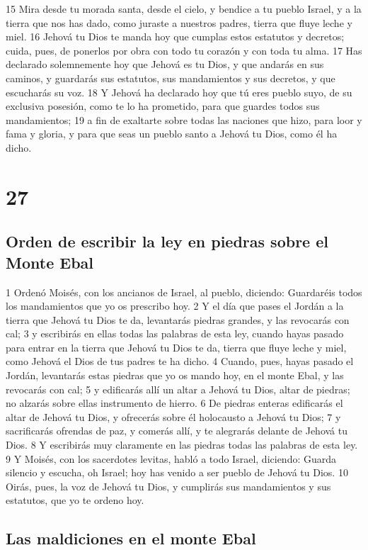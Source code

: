 15 Mira desde tu morada santa, desde el cielo, y bendice a tu pueblo Israel, y a la tierra que nos has dado, como juraste a nuestros padres, tierra que fluye leche y miel.
16 Jehová tu Dios te manda hoy que cumplas estos estatutos y decretos; cuida, pues, de ponerlos por obra con todo tu corazón y con toda tu alma.
17 Has declarado solemnemente hoy que Jehová es tu Dios, y que andarás en sus caminos, y guardarás sus estatutos, sus mandamientos y sus decretos, y que escucharás su voz.
18 Y Jehová ha declarado hoy que tú eres pueblo suyo, de su exclusiva posesión, como te lo ha prometido, para que guardes todos sus mandamientos;
19 a fin de exaltarte sobre todas las naciones que hizo, para loor y fama y gloria, y para que seas un pueblo santo a Jehová tu Dios, como él ha dicho.

\chapter{27}

\section{Orden de escribir la ley en piedras sobre el Monte Ebal}

1 Ordenó Moisés, con los ancianos de Israel, al pueblo, diciendo: Guardaréis todos los mandamientos que yo os prescribo hoy.
2 Y el día que pases el Jordán a la tierra que Jehová tu Dios te da, levantarás piedras grandes, y las revocarás con cal; 
3 y escribirás en ellas todas las palabras de esta ley, cuando hayas pasado para entrar en la tierra que Jehová tu Dios te da, tierra que fluye leche y miel, como Jehová el Dios de tus padres te ha dicho.
4 Cuando, pues, hayas pasado el Jordán, levantarás estas piedras que yo os mando hoy, en el monte Ebal, y las revocarás con cal;
5 y edificarás allí un altar a Jehová tu Dios, altar de piedras; no alzarás sobre ellas instrumento de hierro.
6 De piedras enteras edificarás el altar de Jehová tu Dios, y ofrecerás sobre él holocausto a Jehová tu Dios;
7 y sacrificarás ofrendas de paz, y comerás allí, y te alegrarás delante de Jehová tu Dios.
8 Y escribirás muy claramente en las piedras todas las palabras de esta ley.
9 Y Moisés, con los sacerdotes levitas, habló a todo Israel, diciendo: Guarda silencio y escucha, oh Israel; hoy has venido a ser pueblo de Jehová tu Dios.
10 Oirás, pues, la voz de Jehová tu Dios, y cumplirás sus mandamientos y sus estatutos, que yo te ordeno hoy.

\section{Las maldiciones en el monte Ebal}

